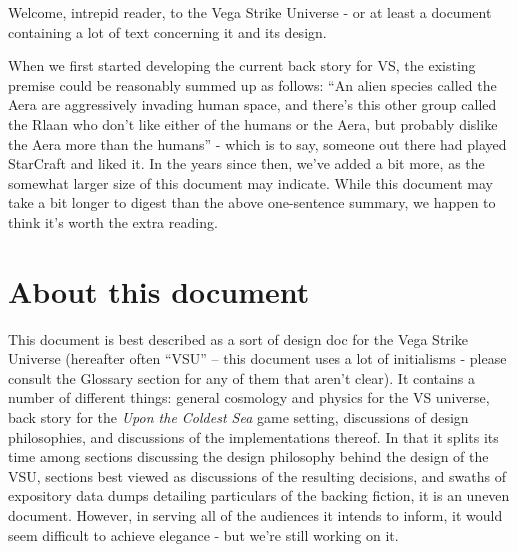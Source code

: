 Welcome, intrepid reader, to the Vega Strike Universe - or at least a
document containing a lot of text concerning it and its design.

When we first started developing the current back story for VS, the
existing premise could be reasonably summed up as follows: ``An alien
species called the Aera are aggressively invading human space, and
there's this other group called the Rlaan who don't like either of the
humans or the Aera, but probably dislike the Aera more than the
humans'' - which is to say, someone out there had played StarCraft and
liked it. In the years since then, we've added a bit more, as the
somewhat larger size of this document may indicate. While this
document may take a bit longer to digest than the above one-sentence
summary, we happen to think it's worth the extra reading.

\section*{About this document}
This document is best described as a sort of design doc for the Vega
Strike Universe (hereafter often ``VSU'' -- this document uses a lot
of initialisms - please consult the Glossary section for any of them
that aren't clear). It contains a number of different things: general
cosmology and physics for the VS universe, back story for the {\it
Upon the Coldest Sea} game setting, discussions of design
philosophies, and discussions of the implementations thereof. In that
it splits its time among sections discussing the design philosophy
behind the design of the VSU, sections best viewed as discussions of
the resulting decisions, and swaths of expository data dumps detailing
particulars of the backing fiction, it is an uneven document. However,
in serving all of the audiences it intends to inform, it would seem
difficult to achieve elegance - but we're still working on it.

